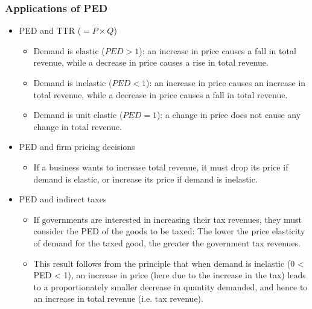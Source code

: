 \subsubsection*{Applications of PED}
\begin{itemize}
  \item PED and TTR ($=P\times Q$)
  \begin{itemize}
    \item Demand is elastic ($PED>1$): an increase in price causes a fall in total revenue, while a decrease in price causes a rise in total revenue. 
    \item Demand is inelastic ($PED<1$): an increase in price causes an increase in total revenue, while a decrease in price causes a fall in total revenue.
    \item Demand is unit elastic ($PED=1$): a change in price does not cause any change in total revenue.
  \end{itemize}
  \item PED and firm pricing decisions
  \begin{itemize}
    \item If a business wants to increase total revenue, it must drop its price if demand is elastic, or increase its price if demand is inelastic.
  \end{itemize}
  \item PED and indirect taxes
  \begin{itemize}
    \item If governments are interested in increasing their tax revenues, they must consider the PED of the goods to be taxed: The lower the price elasticity of demand for the taxed good, the greater the government tax revenues.
    \item This result follows from the principle that when demand is inelastic (0 < PED < 1), an increase in price (here due to the increase in the tax) leads to a proportionately smaller decrease in quantity demanded, and hence to an increase in total revenue (i.e. tax revenue).
  \end{itemize}
\end{itemize}
